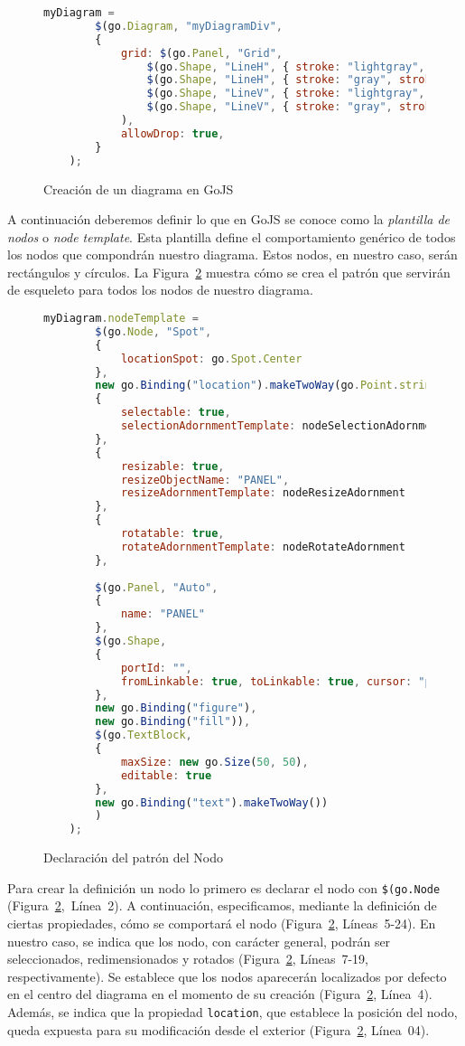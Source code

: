 \begin{figure}[!tb]
	\centering
	\begin{lstlisting}[language=JavaScript]
	myDiagram =
		$(go.Diagram, "myDiagramDiv",
		{
			grid: $(go.Panel, "Grid",
				$(go.Shape, "LineH", { stroke: "lightgray", strokeWidth: 0.5 }),
				$(go.Shape, "LineH", { stroke: "gray", strokeWidth: 0.5, interval: 10 }),
				$(go.Shape, "LineV", { stroke: "lightgray", strokeWidth: 0.5 }),
				$(go.Shape, "LineV", { stroke: "gray", strokeWidth: 0.5, interval: 10 })
			),
			allowDrop: true,
		}
	);\end{lstlisting}
	\caption{Creación de un diagrama en GoJS}
	\label{fig:creacionDiagrama}
\end{figure}

A continuación deberemos definir lo que en GoJS se conoce como la \emph{plantilla de nodos} o \emph{node template}. Esta plantilla define el comportamiento genérico de todos los nodos que compondrán nuestro diagrama. Estos nodos, en nuestro caso, serán rectángulos y círculos. La Figura~\ref{fig:patronNodo} muestra cómo se crea el patrón que servirán de esqueleto para todos los nodos de nuestro diagrama. 

\begin{figure}[!tb]
	\centering
	\begin{lstlisting}[language=JavaScript]
	myDiagram.nodeTemplate =
		$(go.Node, "Spot",
		{ 
			locationSpot: go.Spot.Center 
		},
		new go.Binding("location").makeTwoWay(go.Point.stringify),
		{ 
			selectable: true, 
			selectionAdornmentTemplate: nodeSelectionAdornment 
		},
		{ 
			resizable: true, 
			resizeObjectName: "PANEL", 
			resizeAdornmentTemplate: nodeResizeAdornment 
		},
		{ 
			rotatable: true, 
			rotateAdornmentTemplate: nodeRotateAdornment 
		},
	
		$(go.Panel, "Auto",
		{ 
			name: "PANEL" 
		},
		$(go.Shape,
		{
			portId: "",
			fromLinkable: true, toLinkable: true, cursor: "pointer",
		},
		new go.Binding("figure"),
		new go.Binding("fill")),
		$(go.TextBlock,
		{
			maxSize: new go.Size(50, 50),
			editable: true
		},
		new go.Binding("text").makeTwoWay())
		)
	);\end{lstlisting}
\caption{Declaración del patrón del Nodo}
\label{fig:patronNodo}
\end{figure}

Para crear la definición un nodo lo primero es declarar el nodo con \texttt{\$(go.Node} (Figura~\ref{fig:patronNodo},~Línea~2).
A continuación, especificamos, mediante la definición de ciertas propiedades, cómo se comportará el nodo (Figura~\ref{fig:patronNodo}, Líneas~5-24). En nuestro caso, se indica que los nodo, con carácter general, podrán ser seleccionados, redimensionados y rotados (Figura~\ref{fig:patronNodo}, Líneas~7-19, respectivamente). Se establece que los nodos aparecerán localizados por defecto en el centro del diagrama en el momento de su creación (Figura~\ref{fig:patronNodo}, Línea~4).
Además, se indica que la propiedad \texttt{location}, que establece la posición del nodo, queda expuesta para su modificación desde el exterior (Figura~\ref{fig:patronNodo}, Línea~04).

